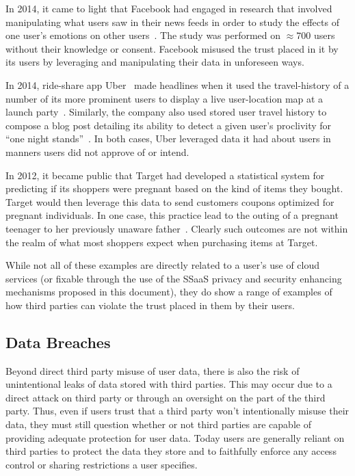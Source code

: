 \begin{packed_desc}
\item[Facebook Emotional Contagion Study:] In 2014, it came to light
  that Facebook had engaged in research that involved manipulating
  what users saw in their news feeds in order to study the effects of
  one user's emotions on other users~\cite{goel2014}. The study was
  performed on $\approx700$ users without their knowledge or
  consent. Facebook misused the trust placed in it by its users by
  leveraging and manipulating their data in unforeseen ways.
\item[Uber User Travel History:] In 2014, ride-share app
  Uber~\cite{uber} made headlines when it used the travel-history of a
  number of its more prominent users to display a live user-location
  map at a launch party~\cite{sims2014}. Similarly, the company also
  used stored user travel history to compose a blog post detailing its
  ability to detect a given user's proclivity for ``one night
  stands''~\cite{pagliery2014}. In both cases, Uber leveraged data it
  had about users in manners users did not approve of or intend.
\item[Target Pregnancy Prediction:] In 2012, it became public that
  Target had developed a statistical system for predicting if its
  shoppers were pregnant based on the kind of items they
  bought. Target would then leverage this data to send customers
  coupons optimized for pregnant individuals. In one case, this
  practice lead to the outing of a pregnant teenager to her previously
  unaware father~\cite{hill2012}. Clearly such outcomes are not within
  the realm of what most shoppers expect when purchasing items at
  Target.
\end{packed_desc}

While not all of these examples are directly related to a user's use
of cloud services (or fixable through the use of the SSaaS privacy and
security enhancing mechanisms proposed in this document), they do show
a range of examples of how third parties can violate the trust placed
in them by their users.

\subsection{Data Breaches}

Beyond direct third party misuse of user data, there is also the risk
of unintentional leaks of data stored with third parties. This may
occur due to a direct attack on third party or through an oversight on
the part of the third party. Thus, even if users trust that a third
party won't intentionally misuse their data, they must still question
whether or not third parties are capable of providing adequate
protection for user data. Today users are generally reliant on third
parties to protect the data they store and to faithfully enforce any
access control or sharing restrictions a user specifies.

